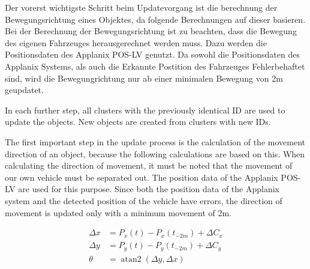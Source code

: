 \documentclass[11pt,oneside,openright]{mpreport}
\DeclareMathOperator{\atantwo}{atan2}
\begin{document}


Der vorerst wichtigste Schritt beim Updatevorgang ist die berechnung der Bewegungsrichtung eines Objektes, da folgende Berechnungen auf dieser basieren.
Bei der Berechnung der Bewegungsrichtung ist zu beachten, dass die Bewegung des eigenen Fahrzeuges herausgerechnet werden muss.
Dazu werden die Positionsdaten des Applanix POS-LV genutzt. Da sowohl die Positionsdaten des Applanix Systems, als auch die Erkannte Postition des Fahrzeuges Fehlerbehaftet sind,
wird die Bewegungrichtung nur ab einer minimalen Bewegung von 2m geupdatet.

In each further step, all clusters with the previously identical ID are used to update the objects. New objects are created from clusters with new IDs.

The first important step in the update process is the calculation of the movement direction of an object, because the following calculations are based on this.
When calculating the direction of movement, it must be noted that the movement of our own vehicle must be separated out. The position data of the Applanix POS-LV are used for this purpose.
Since both the position data of the Applanix system and the detected position of the vehicle have errors, the direction of movement is updated only with a minimum movement of 2m.

\begin{align*}
\Delta x &= P_x(t) - P_x(t_{-2m}) + \Delta C_x\\
\Delta y &= P_y(t) - P_y(t_{-2m}) + \Delta C_y\\
\theta &= \atantwo(\Delta y,\Delta x)
\end{align*}
\end{document}
